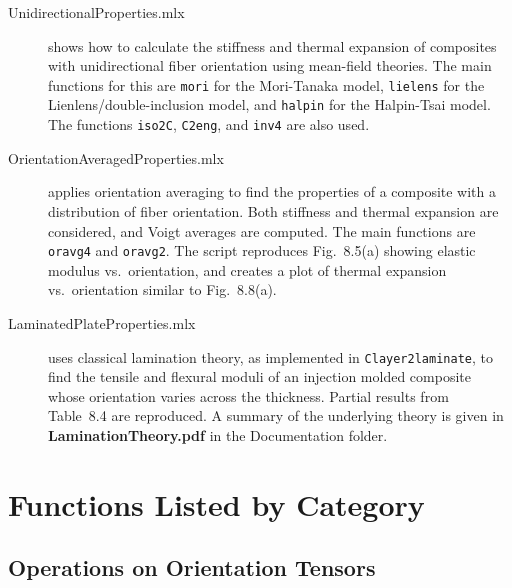 \documentclass[11pt]{article}
\begin{document}
\begin{description}

    \item[UnidirectionalProperties.mlx]{shows how to calculate the stiffness and thermal expansion of composites with unidirectional fiber orientation using mean-field theories.  The main functions for this are \texttt{mori} for the Mori-Tanaka model, \texttt{lielens} for the Lienlens/double-inclusion model, and \texttt{halpin} for the Halpin-Tsai model.  The functions \texttt{iso2C}, \texttt{C2eng}, and \texttt{inv4} are also used.}
    
    \item[OrientationAveragedProperties.mlx]{applies orientation averaging to find the properties of a composite with a distribution of fiber orientation.  Both stiffness and thermal expansion are considered, and Voigt averages are computed.  The main functions are \texttt{oravg4} and \texttt{oravg2}.  The script reproduces Fig.~8.5(a) showing elastic modulus vs.\ orientation, and creates a plot of thermal expansion vs.\ orientation similar to Fig.~8.8(a).}
        
    \item[LaminatedPlateProperties.mlx]{uses classical lamination theory, as implemented in \break \texttt{Clayer2laminate}, to find the tensile and flexural moduli of an injection molded composite whose orientation varies across the thickness.  Partial results from Table~8.4 are reproduced.  A summary of the underlying theory is given in \textbf{LaminationTheory.pdf} in the Documentation folder.}
\end{description}

\section{Functions Listed by Category}

\subsection{Operations on Orientation Tensors}
\end{document}
